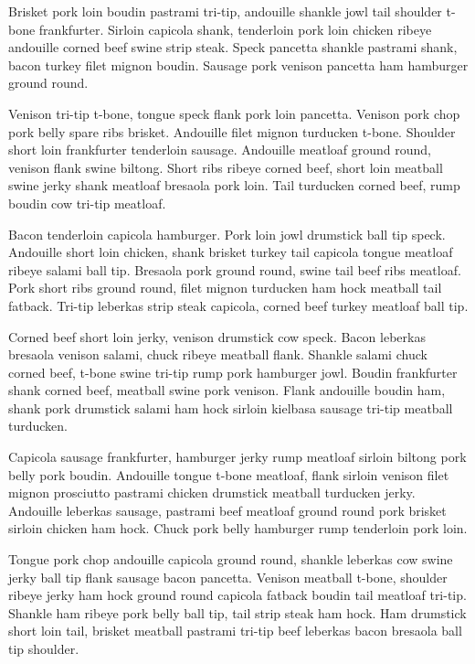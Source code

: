 Brisket pork loin boudin pastrami tri-tip, andouille shankle jowl tail shoulder t-bone frankfurter. Sirloin capicola shank, tenderloin pork loin chicken ribeye andouille corned beef swine strip steak. Speck pancetta shankle pastrami shank, bacon turkey filet mignon boudin. Sausage pork venison pancetta ham hamburger ground round.

Venison tri-tip t-bone, tongue speck flank pork loin pancetta. Venison pork chop pork belly spare ribs brisket. Andouille filet mignon turducken t-bone. Shoulder short loin frankfurter tenderloin sausage. Andouille meatloaf ground round, venison flank swine biltong. Short ribs ribeye corned beef, short loin meatball swine jerky shank meatloaf bresaola pork loin. Tail turducken corned beef, rump boudin cow tri-tip meatloaf.

Bacon tenderloin capicola hamburger. Pork loin jowl drumstick ball tip speck. Andouille short loin chicken, shank brisket turkey tail capicola tongue meatloaf ribeye salami ball tip. Bresaola pork ground round, swine tail beef ribs meatloaf. Pork short ribs ground round, filet mignon turducken ham hock meatball tail fatback. Tri-tip leberkas strip steak capicola, corned beef turkey meatloaf ball tip.

Corned beef short loin jerky, venison drumstick cow speck. Bacon leberkas bresaola venison salami, chuck ribeye meatball flank. Shankle salami chuck corned beef, t-bone swine tri-tip rump pork hamburger jowl. Boudin frankfurter shank corned beef, meatball swine pork venison. Flank andouille boudin ham, shank pork drumstick salami ham hock sirloin kielbasa sausage tri-tip meatball turducken.

Capicola sausage frankfurter, hamburger jerky rump meatloaf sirloin biltong pork belly pork boudin. Andouille tongue t-bone meatloaf, flank sirloin venison filet mignon prosciutto pastrami chicken drumstick meatball turducken jerky. Andouille leberkas sausage, pastrami beef meatloaf ground round pork brisket sirloin chicken ham hock. Chuck pork belly hamburger rump tenderloin pork loin.

Tongue pork chop andouille capicola ground round, shankle leberkas cow swine jerky ball tip flank sausage bacon pancetta. Venison meatball t-bone, shoulder ribeye jerky ham hock ground round capicola fatback boudin tail meatloaf tri-tip. Shankle ham ribeye pork belly ball tip, tail strip steak ham hock. Ham drumstick short loin tail, brisket meatball pastrami tri-tip beef leberkas bacon bresaola ball tip shoulder.

